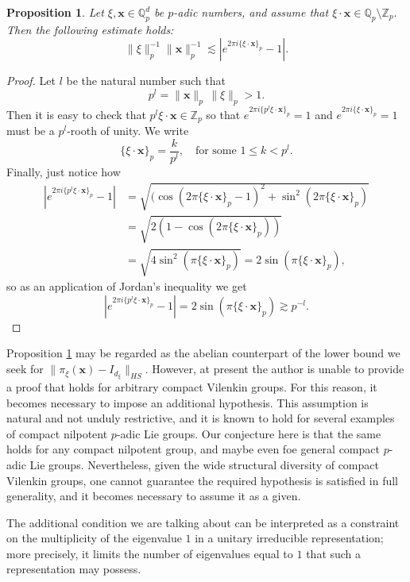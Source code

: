 \documentclass[12pt, reqno]{amsart}
\newtheorem{pro}[defi]{Proposition}
\newcommand{\Q}{\mathbb{Q}}
\newcommand{\Z}{\mathbb{Z}}
\newcommand{\1}{\mathds{1}}
\begin{document}
\begin{pro}\label{pronormAbelian}
    Let $\xi , \mathbf{x}\in \Q_p^d$ be $p$-adic numbers, and assume that $\xi \cdot \mathbf{x} \in \Q_p \setminus \Z_p.$ Then the following estimate holds:
    $$\| \xi \|_p^{-1} \| \mathbf{x}\|_p^{-1} \lesssim |e^{2 \pi i \{\xi \cdot \mathbf{x}\}_p} -1|.$$
    
    \end{pro}

\begin{proof}
Let $l$ be the natural number such that 
\[
p^l = \|\mathbf{x}\|_p \, \|\xi\|_p>1.
\]Then it is easy to check that $p^l \xi \cdot \mathbf{x} \in \Z_p$ so that $e^{2 \pi i\{p^l \xi \cdot \mathbf{x} \}_p} =1$ and  $e^{2 \pi i\{ \xi \cdot \mathbf{x} \}_p} =1$ must be a $p^l$-rooth of unity. We write $$\{ \xi \cdot \mathbf{x} \}_p = \frac{k}{p^l}, \quad \text{for some} \, \, 1 \leq k <p^l.$$ 
   Finally, just notice how \begin{align*}
       |e^{2 \pi i\{p^l \xi \cdot \mathbf{x} \}_p} -1|&= \sqrt{(\cos (2 \pi\{ \xi \cdot \mathbf{x} \}_p -1 )^2 + \sin^2 (2 \pi\{ \xi \cdot \mathbf{x} \}_p)} \\ &= \sqrt{2 (1- \cos(2 \pi\{ \xi \cdot \mathbf{x} \}_p))} \\ &= \sqrt{4 \sin^2 ( \pi\{ \xi \cdot \mathbf{x} \}_p)} =2  \sin( \pi\{ \xi \cdot \mathbf{x} \}_p),
   \end{align*}so as an application of Jordan's inequality we get $$|e^{2 \pi i\{p^l \xi \cdot \mathbf{x} \}_p} -1| =2  \sin( \pi\{ \xi \cdot \mathbf{x} \}_p) \gtrsim p^{-l}.$$
\end{proof}


Proposition \ref{pronormAbelian} may be regarded as the abelian counterpart 
of the lower bound we seek for $\|\pi_\xi(\mathbf{x}) - I_{d_\xi}\|_{HS}.$ However, at present the author is unable to provide a proof that holds 
for arbitrary compact Vilenkin groups. For this reason, it becomes necessary
to impose an additional hypothesis. This assumption is natural and not unduly restrictive, and it is known to hold for several examples  of compact nilpotent $p$-adic Lie groups. Our conjecture here is that the same holds for any compact nilpotent group, and maybe even foe general compact $p$-adic Lie groups. Nevertheless, given the wide structural diversity of 
compact Vilenkin groups, one cannot guarantee the required hypothesis is satisfied in 
full generality, and it becomes necessary to assume it as a given.

The additional condition we are talking about can be interpreted as a constraint on the 
multiplicity of the eigenvalue $1$ in a unitary irreducible representation; 
more precisely, it limits the number of eigenvalues equal to $1$ that such 
a representation may possess. 
\end{document}
